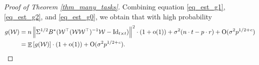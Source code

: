 \begin{proof}[Proof of Theorem \ref{thm_many_tasks}]
	Combining equation \eqref{eq_est_g1}, \eqref{eq_est_g2}, and \eqref{eq_est_g0}, we obtain that with high probability
	\begin{align}
	g(\mathcal W)&= n \left\| \Sigma^{1/2} B^{\star} ({\mathcal W}^{\top} ({\mathcal W} {\mathcal W}^{\top})^{-1} {\mathcal W} - \operatorname{Id}_{t\times t}) \right\|^2 \cdot (1+\operatorname{o}(1)) + \sigma^2 (n\cdot t - p \cdot r)+\operatorname{O}(\sigma^2 p^{1/2+{\mathit{c}}}) \nonumber \\
	&=\mathop{\mathbb{E}}\left[ g({\mathcal W}) \right] \cdot (1+\operatorname{o}(1)) + \operatorname{O}(\sigma^2 p^{1/2+{\mathit{c}}}). \label{eq_est_g}
	\end{align}

	



\end{proof}
